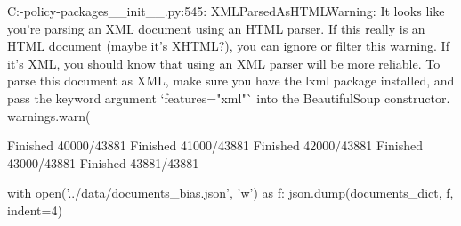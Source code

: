 \begin{pyprint}
C:\Users\bessex\AppData\Local\mambaforge\envs\climate-policy\lib\site-packages\builder\__init__.py:545: XMLParsedAsHTMLWarning: It looks like you're parsing an XML document using an HTML parser. If this really is an HTML document (maybe it's XHTML?), you can ignore or filter this warning. If it's XML, you should know that using an XML parser will be more reliable. To parse this document as XML, make sure you have the lxml package installed, and pass the keyword argument `features="xml"` into the BeautifulSoup constructor.
  warnings.warn(
\end{pyprint}

\begin{pyprint}
Finished 40000/43881
Finished 41000/43881
Finished 42000/43881
Finished 43000/43881
Finished 43881/43881
\end{pyprint}

\begin{pyin}
with open('../data/documents_bias.json', 'w') as f:
    json.dump(documents_dict, f, indent=4)
\end{pyin}
